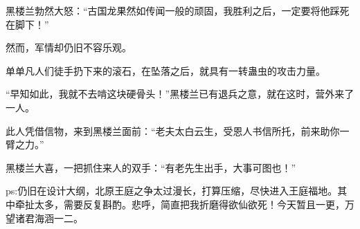 \begin{this_body}
黑楼兰勃然大怒：“古国龙果然如传闻一般的顽固，我胜利之后，一定要将他踩死在脚下！”

然而，军情却仍旧不容乐观。

单单凡人们徒手扔下来的滚石，在坠落之后，就具有一转蛊虫的攻击力量。

“早知如此，我就不去啃这块硬骨头！”黑楼兰已有退兵之意，就在这时，营外来了一人。

此人凭借信物，来到黑楼兰面前：“老夫太白云生，受恩人书信所托，前来助你一臂之力。”

黑楼兰大喜，一把抓住来人的双手：“有老先生出手，大事可图也！”

ps:仍旧在设计大纲，北原王庭之争太过漫长，打算压缩，尽快进入王庭福地。其中牵扯太多，需要反复斟酌。悲呼，简直把我折磨得欲仙欲死！今天暂且一更，万望诸君海涵一二。

\end{this_body}

